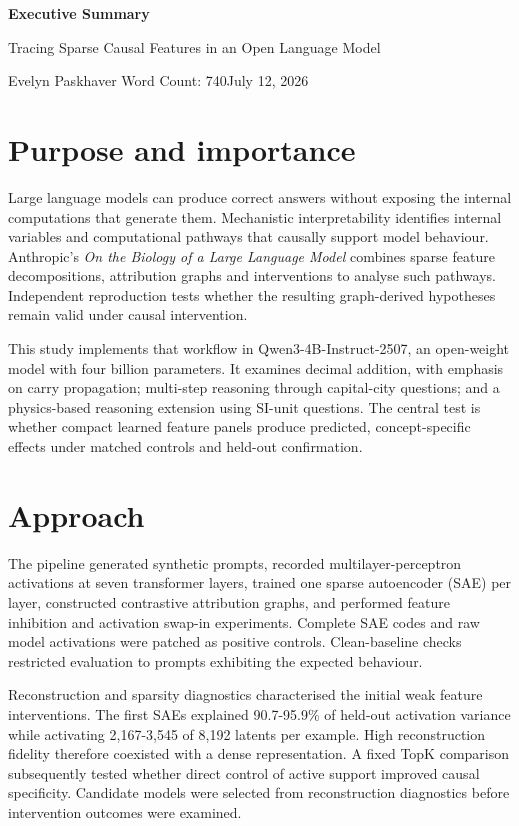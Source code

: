 \documentclass[11pt,a4paper]{article}
\begin{document}
\begin{center}
    {\LARGE\bfseries Executive Summary\par}
    \vspace{0.35cm}
    {\large Tracing Sparse Causal Features in an Open Language Model\par}
    \vspace{0.25cm}
    {\normalsize Evelyn Paskhaver \hfill Word Count: 740\hfill July 12, 2026\par}
\end{center}

\section*{Purpose and importance}

Large language models can produce correct answers without exposing the internal computations that generate them. Mechanistic interpretability identifies internal variables and computational pathways that causally support model behaviour. Anthropic's \emph{On the Biology of a Large Language Model} combines sparse feature decompositions, attribution graphs and interventions to analyse such pathways. Independent reproduction tests whether the resulting graph-derived hypotheses remain valid under causal intervention.

This study implements that workflow in Qwen3-4B-Instruct-2507, an open-weight model with four billion parameters. It examines decimal addition, with emphasis on carry propagation; multi-step reasoning through capital-city questions; and a physics-based reasoning extension using SI-unit questions. The central test is whether compact learned feature panels produce predicted, concept-specific effects under matched controls and held-out confirmation.

\section*{Approach}

The pipeline generated synthetic prompts, recorded multilayer-perceptron activations at seven transformer layers, trained one sparse autoencoder (SAE) per layer, constructed contrastive attribution graphs, and performed feature inhibition and activation swap-in experiments. Complete SAE codes and raw model activations were patched as positive controls. Clean-baseline checks restricted evaluation to prompts exhibiting the expected behaviour.

Reconstruction and sparsity diagnostics characterised the initial weak feature interventions. The first SAEs explained 90.7-95.9\% of held-out activation variance while activating 2,167-3,545 of 8,192 latents per example. High reconstruction fidelity therefore coexisted with a dense representation. A fixed TopK comparison subsequently tested whether direct control of active support improved causal specificity. Candidate models were selected from reconstruction diagnostics before intervention outcomes were examined.
\end{document}
